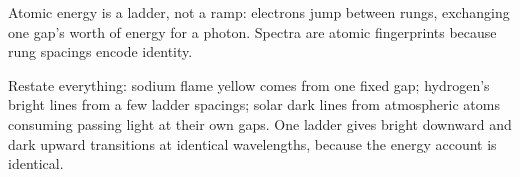 \begin{oneline}
Atomic energy is a ladder, not a ramp: electrons jump between rungs, exchanging one gap's worth of energy for a photon. Spectra are atomic fingerprints because rung spacings encode identity.
\end{oneline}

\begin{mainline}
Restate everything: sodium flame yellow comes from one fixed gap; hydrogen's bright lines from a few ladder spacings; solar dark lines from atmospheric atoms consuming passing light at their own gaps. One ladder gives bright downward and dark upward transitions at identical wavelengths, because the energy account is identical.
\end{mainline}



